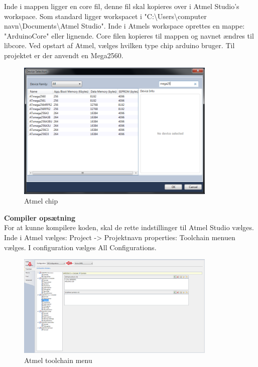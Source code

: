 Inde i mappen ligger en core fil, denne fil skal kopieres over i Atmel Studio's workspace. Som standard ligger workspacet i "C:\textbackslash Users\textbackslash computer navn\textbackslash Documents\textbackslash Atmel Studio". 
Inde i Atmels workspace oprettes en mappe: "ArduinoCore" eller lignende. Core filen kopieres til mappen og navnet ændres til libcore.
Ved opstart af Atmel, vælges hvilken type chip arduino bruger. Til projektet er der anvendt en Mega2560.

\begin{figure}[H]
	\centering
	\includegraphics[width=0.85\textwidth]{Billeder/implementation/Howtoguide/atmel_chipvalg.png}
	\caption{Atmel chip}
	\label{fig:atmel_chip}
\end{figure}

\textbf{Compiler opsætning} \\
For at kunne kompilere koden, skal de rette indstillinger til Atmel Studio vælges. 
Inde i Atmel vælges: Project -> Projektnavn properties:
Toolchain menuen vælges. I configuration vælges All Configurations.

\begin{figure}[H]
	\centering
	\includegraphics[width=0.85\textwidth]{Billeder/implementation/Howtoguide/atmel_toolchain.png}
	\caption{Atmel toolchain menu}
	\label{fig:atmel_indstillinger}
\end{figure}

